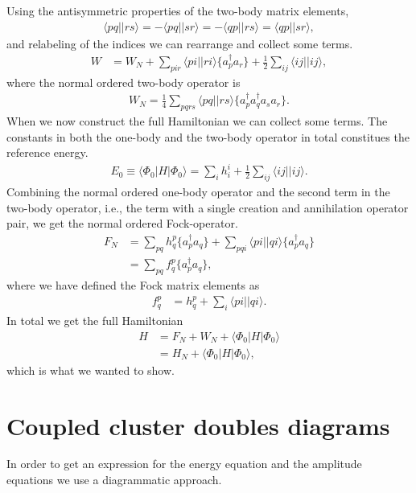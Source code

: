 \documentclass[
    a4paper, aps, twocolumn, floatfix, superscriptaddress,
    nofootinbib]{revtex4-1}
\newcommand{\1}{\mathds{1}}
\newcommand{\half}{\frac{1}{2}}
\newcommand{\bra}[1]{\langle #1\lvert}
\newcommand{\ket}[1]{\rvert #1\rangle}
\newcommand{\acr}[1]{a_{#1}^{\dagger}}
\newcommand{\ade}[1]{a_{#1}}
\newcommand{\kslat}{\ket{\Phi_0}}
\newcommand{\bslat}{\bra{\Phi_0}}
\begin{document}
    Using the antisymmetric properties of the two-body matrix elements,
    \begin{align}
        \bra{pq}\ket{rs}
        = - \bra{pq}\ket{sr}
        = - \bra{qp}\ket{rs}
        = \bra{qp}\ket{sr},
    \end{align}
    and relabeling of the indices we can rearrange and collect some terms.
    \begin{align}
        W
        &=
        W_N + \sum_{pir}\bra{pi}\ket{ri}\{\acr{p}\ade{r}\}
        + \half\sum_{ij}\bra{ij}\ket{ij},
    \end{align}
    where the normal ordered two-body operator is
    \begin{align}
        W_N = \frac{1}{4}\sum_{pqrs}
        \bra{pq}\ket{rs}\{\acr{p}\acr{q}\ade{s}\ade{r}\}.
    \end{align}
    When we now construct the full Hamiltonian we can collect some terms. The
    constants in both the one-body and the two-body operator in total constitues
    the reference energy.
    \begin{align}
        E_0 \equiv \bslat H\kslat
        = \sum_{i}h_i^i + \frac{1}{2}\sum_{ij}\bra{ij}\ket{ij}.
        \label{eq:reference_energy}
    \end{align}
    Combining the normal ordered one-body operator and the second term in the
    two-body operator, i.e., the term with a single creation and annihilation
    operator pair, we get the normal ordered Fock-operator.
    \begin{align}
        F_N
        &=
        \sum_{pq}h_{q}^{p}\{\acr{p}\ade{q}\}
        + \sum_{pqi}\bra{pi}\ket{qi}\{\acr{p}\ade{q}\}
        \\
        &= \sum_{pq}f_{q}^{p}\{\acr{p}\ade{q}\},
    \end{align}
    where we have defined the Fock matrix elements as
    \begin{align}
        f_{q}^{p}
        &=
        h_q^p + \sum_{i}\bra{pi}\ket{qi}.
    \end{align}
    In total we get the full Hamiltonian
    \begin{align}
        H
        &=
        F_N + W_N + \bslat H\kslat
        \\
        &= H_N + \bslat H\kslat,
    \end{align}
    which is what we wanted to show.\cite{crawford2007introduction}

\section{Coupled cluster doubles diagrams}
    In order to get an expression for the energy equation and the amplitude
    equations we use a diagrammatic approach.
\end{document}

